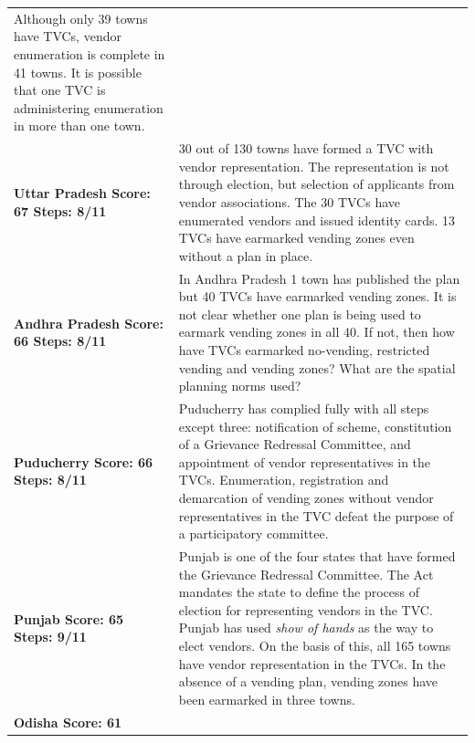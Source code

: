 \documentclass[a4paper, 12pt, twoside]{article}
\begin{document}
{\begin{longtable}[l]{>{\raggedright}p{4cm}>{\raggedright\arraybackslash}p{10cm}}
Although only 39 towns have TVCs, vendor enumeration is complete in 41 towns. It is possible that one TVC is administering enumeration in more than one town.
\\
\cellcolor{SVACgreen3}\bf{Uttar Pradesh}
\newline
\bf{Score: 67}
\newline
\bf{Steps: 8/11}
&
\cellcolor{SVACgreen2}30 out of 130 towns have formed a TVC with vendor representation. The representation is not through election, but selection of applicants from vendor associations. The 30 TVCs have enumerated vendors and issued identity cards. 13 TVCs have earmarked vending zones even without a plan in place.
\\
\cellcolor{SVACgreen3}\bf{Andhra Pradesh}
\newline
\bf{Score: 66}
\newline
\bf{Steps: 8/11}
&
\cellcolor{SVACgreen2}In Andhra Pradesh 1 town has published the plan but 40 TVCs have earmarked vending zones. It is not clear whether one plan is being used to earmark vending zones in all 40. If not, then how have TVCs earmarked no-vending, restricted vending and vending zones? What are the spatial planning norms used?
\\
\cellcolor{SVACgreen3}\bf{Puducherry}
\newline
\bf{Score: 66}
\newline
\bf{Steps: 8/11}
&
\cellcolor{SVACgreen2}Puducherry has complied fully with all steps except three: notification of scheme, constitution of a Grievance Redressal Committee, and appointment of vendor representatives in the TVCs. Enumeration, registration and demarcation of vending zones without vendor representatives in the TVC defeat the purpose of a participatory committee.
\\
\cellcolor{SVACgreen3}\bf{Punjab}
\newline
\bf{Score: 65}
\newline
\bf{Steps: 9/11}
&
\cellcolor{SVACgreen2}Punjab is one of the four states that have formed the Grievance Redressal Committee. The Act mandates the state to define the process of election for representing vendors in the TVC. Punjab has used \textit{show of hands} as the way to elect vendors. On the basis of  this, all 165 towns have vendor representation in the TVCs. In the absence of a vending plan, vending zones have been earmarked in three towns.
\\
\cellcolor{SVACgreen3}\bf{Odisha}
\newline
\bf{Score: 61}
\newline

\end{longtable}}
\end{document}
